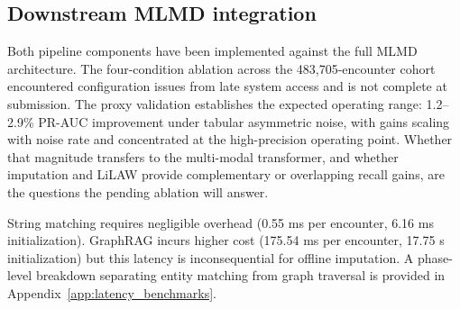 \subsection{Downstream MLMD integration}

Both pipeline components have been implemented against the full MLMD architecture. The four-condition ablation across the 483,705-encounter cohort encountered configuration issues from late system access and is not complete at submission. The proxy validation establishes the expected operating range: 1.2--2.9\% PR-AUC improvement under tabular asymmetric noise, with gains scaling with noise rate and concentrated at the high-precision operating point. Whether that magnitude transfers to the multi-modal transformer, and whether imputation and LiLAW provide complementary or overlapping recall gains, are the questions the pending ablation will answer.

String matching requires negligible overhead (0.55 ms per encounter, 6.16 ms initialization). GraphRAG incurs higher cost (175.54 ms per encounter, 17.75 s initialization) but this latency is inconsequential for offline imputation. A phase-level breakdown separating entity matching from graph traversal is provided in Appendix~\ref{app:latency_benchmarks}.
